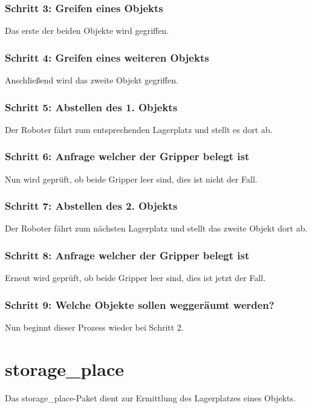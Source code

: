 \documentclass{suturo}
\begin{document}
\subsubsection*{Schritt 3: Greifen eines Objekts}
Das erste der beiden Objekte wird gegriffen.

\subsubsection*{Schritt 4: Greifen eines weiteren Objekts}
Anschließend wird das zweite Objekt gegriffen.

\subsubsection*{Schritt 5: Abstellen des 1. Objekts}
Der Roboter fährt zum entsprechenden Lagerplatz und stellt es dort ab.

\subsubsection*{Schritt 6: Anfrage welcher der Gripper belegt ist}
Nun wird geprüft, ob beide Gripper leer sind, dies ist nicht der Fall.

\subsubsection*{Schritt 7: Abstellen des 2. Objekts}
Der Roboter fährt zum nächsten Lagerplatz und stellt das zweite Objekt dort ab.

\subsubsection*{Schritt 8: Anfrage welcher der Gripper belegt ist}
Erneut wird geprüft, ob beide Gripper leer sind, dies ist jetzt der Fall.

\subsubsection*{Schritt 9: Welche Objekte sollen weggeräumt werden?}
Nun beginnt dieser Prozess wieder bei Schritt 2.


\section{storage\_place}
Das storage\_place-Paket dient zur Ermittlung des Lagerplatzes eines Objekts.

\begin{figure}[!htb]
\end{figure}
      
\end{document}
